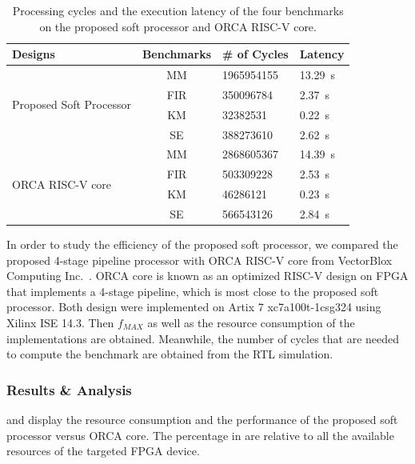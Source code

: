 \begin{table}
\begin{center}
  \caption{Processing cycles and the execution latency of the four benchmarks on the proposed soft processor and ORCA RISC-V core.}
  \label{tab:guy_benchmark}
\renewcommand{\arraystretch}{1.5}
  \small
	\begin{tabular}{lcll}
    \toprule
	 \bf Designs & \bf Benchmarks  &  \bf \# of Cycles & \bf Latency\\ 
	 \hline	
	\multirow{4}{*}{\begin{minipage}{0.5in}Proposed Soft Processor\end{minipage}}
	 & MM & 1965954155 & \SI{13.29}{\second} \\
	 & FIR & 350096784 & \SI{2.37}{\second} \\
	 & KM & 32382531 & \SI{0.22}{\second} \\
	 & SE & 388273610 & \SI{2.62}{\second} \\
	\hline	
	\multirow{4}{*}{\begin{minipage}{0.5in}ORCA RISC-V core\end{minipage}}
	 & MM & 2868605367 & \SI{14.39}{\second} \\
	 & FIR & 503309228 & \SI{2.53}{\second} \\
	 & KM & 46286121 & \SI{0.23}{\second} \\
	 & SE & 566543126 & \SI{2.84}{\second} \\

    \bottomrule    
  \end{tabular}
\end{center}
\vspace{-2em}
\end{table} 

In order to study the efficiency of the proposed soft processor, we compared the proposed 4-stage pipeline processor with ORCA RISC-V core from VectorBlox Computing Inc.~\cite{vectorblox}. ORCA core is known as an optimized RISC-V design on FPGA that implements a 4-stage pipeline, which is most close to the proposed soft processor. Both design were implemented on Artix 7 xc7a100t-1csg324 using Xilinx ISE 14.3. Then $f_{MAX}$ as well as the resource consumption of the implementations are obtained. Meanwhile, the number of cycles that are needed to compute the benchmark are obtained from the RTL simulation.   

\subsubsection{Results \& Analysis}
 and  display the resource consumption and the performance of the proposed soft processor versus ORCA core. The percentage in  are relative to all the available resources of the targeted FPGA device.

